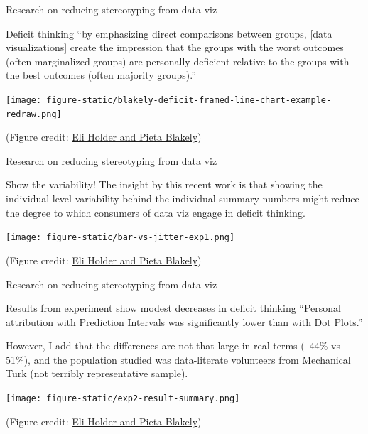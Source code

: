 \documentclass[table]{beamer}\usepackage[]{graphicx}\usepackage[]{xcolor}
\begin{document}

\begin{frame}[fragile]{Research on reducing stereotyping from data viz}

\begin{block}{Deficit thinking}
``by emphasizing direct comparisons between groups, [data visualizations] create the impression that the groups with the worst outcomes (often marginalized groups) are personally deficient relative to the groups with the best outcomes (often majority groups).''
\end{block}

\texttt{[image: figure-static/blakely-deficit-framed-line-chart-example-redraw.png]}

\tiny (Figure credit: \href{https://3iap.com/what-can-go-wrong-racial-equity-data-visualization-deficit-thinking-VV8acXLQQnWvvg4NLP9LTA/}{Eli Holder and Pieta Blakely})


\end{frame}



\begin{frame}[fragile]{Research on reducing stereotyping from data viz}

\begin{block}{Show the variability!}
The insight by this recent work is that showing the individual-level variability behind the individual summary numbers might reduce the degree to which consumers of data viz engage in deficit thinking.
\end{block}

\texttt{[image: figure-static/bar-vs-jitter-exp1.png]}

\tiny (Figure credit: \href{https://3iap.com/what-can-go-wrong-racial-equity-data-visualization-deficit-thinking-VV8acXLQQnWvvg4NLP9LTA/}{Eli Holder and Pieta Blakely})


\end{frame}


\begin{frame}[fragile]{Research on reducing stereotyping from data viz}

\begin{block}{Results from experiment show modest decreases in deficit thinking}
``Personal attribution with Prediction Intervals was significantly lower than with Dot Plots.''

However, I add that the differences are not that large in real terms (~44\% vs ~ 51\%), and the population studied was data-literate volunteers from Mechanical Turk (not terribly representative sample).
\end{block}

\texttt{[image: figure-static/exp2-result-summary.png]}

\tiny (Figure credit: \href{https://3iap.com/dispersion-disparity-equity-centered-data-visualization-research-project-Wi-58RCVQNSz6ypjoIoqOQ/}{Eli Holder and Pieta Blakely})


\end{frame}
\end{document}
